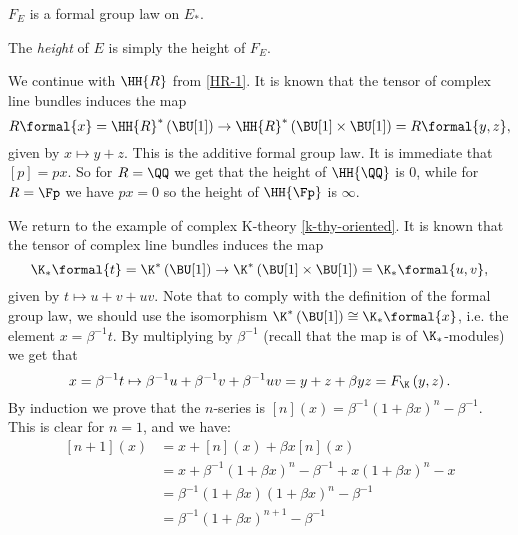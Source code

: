 \begin{proposition}
	$F_E$ is a formal group law on $E_*$.
\end{proposition}

\begin{definition}
	The \emph{height} of $E$ is simply the height of $F_E$.
\end{definition}

\begin{example}\label{HR-2}
	We continue with $\HH{R}$ from \ref{HR-1}.
	It is known that the tensor of complex line bundles induces the map
	$$
	R\formal{x}
	= \HH{R}^*\left(\BU[1]\right)
	\to \HH{R}^*\left(\BU[1] \times \BU[1]\right)
	= R\formal{y,z},
	$$
	given by $x \mapsto y + z$.
	This is the additive formal group law.
	It is immediate that $\left[p\right] = p x$.
	So for $R = \QQ$ we get that the height of $\HH{\QQ}$ is 0, while for $R = \Fp$ we have $p x = 0$ so the height of $\HH{\Fp}$ is $\infty$.
\end{example}

\begin{example}\label{k-thy-fgl}
	We return to the example of complex K-theory \ref{k-thy-oriented}.
	It is known that the tensor of complex line bundles induces the map
	$$
	\K_*\formal{t}
	= \K^*\left(\BU[1]\right)
	\to \K^*\left(\BU[1] \times \BU[1]\right)
	= \K_*\formal{u,v},
	$$
	given by $t \mapsto u + v + u v$.
	Note that to comply with the definition of the formal group law, we should use the isomorphism
	$\K^*\left(\BU[1]\right) \cong \K_* \formal{x}$,
	i.e. the element $x = \beta^{-1	} t$.
	By multiplying by $\beta^{-1}$ (recall that the map is of $\K_*$-modules) we get that
	$$
	x
	= \beta^{-1} t \mapsto \beta^{-1} u + \beta^{-1} v + \beta^{-1} u v
	= y + z + \beta y z
	= F_{\K}\left(y,z\right).
	$$
	By induction we prove that the $n$-series is $\left[n\right]\left(x\right) = \beta^{-1} \left(1 + \beta x\right)^n - \beta^{-1}$.
	This is clear for $n = 1$, and we have:
	\begin{align*}
		\left[n+1\right]\left(x\right)
		&= x + \left[n\right]\left(x\right) + \beta x \left[n\right]\left(x\right)\\
		&= x + \beta^{-1} \left(1 + \beta x\right)^n - \beta^{-1} + x \left(1 + \beta x\right)^n - x\\
		&= \beta^{-1} \left(1 + \beta x\right) \left(1 + \beta x\right)^n - \beta^{-1}\\
		&= \beta^{-1} \left(1 + \beta x\right)^{n+1} - \beta^{-1}
	\end{align*}
\end{example}

